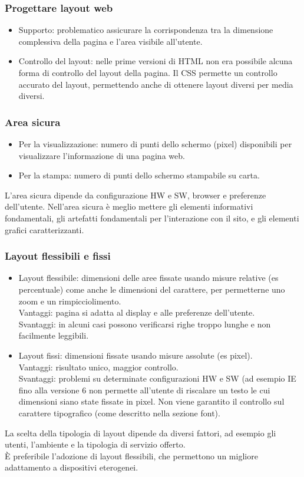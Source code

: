 \documentclass{article}
\begin{document}
\subsubsection{Progettare layout web}
\begin{itemize}
\item Supporto: problematico assicurare la corrispondenza tra la dimensione complessiva della pagina e l'area visibile all'utente.
\item Controllo del layout: nelle prime versioni di HTML non era possibile alcuna forma di controllo del layout della pagina. Il CSS permette un controllo accurato del layout, permettendo anche di ottenere layout diversi per media diversi.
\end{itemize}
\subsubsection{Area sicura}
\begin{itemize}
\item Per la visualizzazione: numero di punti dello schermo (pixel) disponibili per visualizzare l'informazione di una pagina web.
\item Per la stampa: numero di punti dello schermo stampabile su carta.
\end{itemize}
L'area sicura dipende da configurazione HW e SW, browser e preferenze dell'utente.
Nell'area sicura è meglio mettere gli elementi informativi fondamentali, gli artefatti fondamentali per l'interazione con il sito, e gli elementi grafici caratterizzanti.
\subsubsection{Layout flessibili e fissi}
\begin{itemize}
\item Layout flessibile: dimensioni delle aree fissate usando misure relative (es percentuale) come anche le dimensioni del carattere, per permetterne uno zoom e un rimpicciolimento. \\
Vantaggi: pagina si adatta al display e alle preferenze dell'utente.\\
Svantaggi: in alcuni casi possono verificarsi righe troppo lunghe e non facilmente leggibili.
\item Layout fissi: dimensioni fissate usando misure assolute (es pixel).\\
Vantaggi: risultato unico, maggior controllo.\\
Svantaggi: problemi su determinate configurazioni HW  e SW (ad esempio IE fino alla versione 6 non permette all'utente di riscalare un testo le cui dimensioni siano state fissate in pixel. Non viene garantito il controllo sul carattere tipografico (come descritto nella sezione font).
\end{itemize}
La scelta della tipologia di layout dipende da diversi fattori, ad esempio gli utenti, l'ambiente e la tipologia di servizio offerto.\\
È preferibile l'adozione di layout flessibili, che permettono un migliore adattamento a dispositivi eterogenei.
\end{document}
